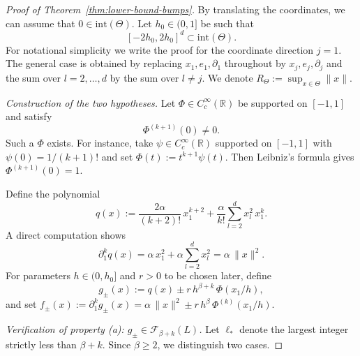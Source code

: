 \documentclass{article}
\renewcommand{\geq}{\geqslant}
\theoremstyle{definition}
\begin{document}
\begin{proof}[Proof of Theorem~\ref{thm:lower-bound-bumps}]

By translating the coordinates, we can assume that 
$0\in\mathrm{int}(\Theta)$. Let $h_0\in(0,1]$ be such that
\begin{equation}
\label{eq:lb-Theta-cube}
[-2h_0,2h_0]^d\subset\mathrm{int}(\Theta).
\end{equation}
For notational simplicity we write the proof for the coordinate 
direction $j=1$. The general case is obtained by replacing 
$x_1,e_1,\partial_1$ throughout by $x_j,e_j,\partial_j$ and the 
sum over $l=2,\dots,d$ by the sum over $l\neq j$. We denote 
$R_\Theta:=\sup_{x\in\Theta}\|x\|$.

\medskip
\noindent\textit{Construction of the two hypotheses.}
Let $\Phi\in C_c^\infty(\mathbb{R})$ be supported on $[-1,1]$ and 
satisfy
\begin{equation}
\label{eq:lb-Phi}
\Phi^{(k+1)}(0)\neq 0.
\end{equation}
Such a $\Phi$ exists. For instance, take 
$\psi\in C_c^\infty(\mathbb{R})$ supported on $[-1,1]$ with 
$\psi(0)=1/(k+1)!$ and set $\Phi(t):=t^{k+1}\psi(t)$. Then 
Leibniz's formula gives $\Phi^{(k+1)}(0)=1$.

Define the polynomial
\begin{equation}
\label{eq:lb-q}
q(x):=\frac{2\alpha}{(k+2)!}\,x_1^{k+2}
+\frac{\alpha}{k!}\sum_{l=2}^d x_l^2\,x_1^k.
\end{equation}
A direct computation shows
\begin{equation}
\label{eq:lb-q-derivative}
\partial_1^k q(x)=\alpha\,x_1^2+\alpha\sum_{l=2}^d x_l^2
=\alpha\,\|x\|^2.
\end{equation}
For parameters $h\in(0,h_0]$ and $r>0$ to be chosen later, define
\begin{equation}
\label{eq:lb-gpm}
g_\pm(x):=q(x)\pm r\,h^{\beta+k}\,\Phi(x_1/h),
\end{equation}
and set 
$f_\pm(x):=\partial_1^k g_\pm(x)
=\alpha\,\|x\|^2\pm r\,h^\beta\,\Phi^{(k)}(x_1/h)$.

\medskip
\noindent\textit{Verification of property (a): $g_\pm\in\mathcal{F}_{\beta+k}(L)$.}
Let $\ell_*$ denote the largest integer strictly less than 
$\beta+k$. Since $\beta\geq 2$, we distinguish two cases.


\end{proof}
\end{document}
